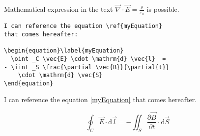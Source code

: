 \begin{Results}
Mathematical expression in the text
${\vec  {\nabla }}\cdot {\vec  {E}}={\frac  {\rho }{\varepsilon _{0}}}$
is possible.
\end{Results}

\begin{LaTeXsource}[Displayed]
\begin{verbatim}
I can reference the equation \ref{myEquation}
that comes hereafter:

\begin{equation}\label{myEquation}
  \oint _C \vec{E} \cdot \mathrm{d} \vec{l}  =
- \iint _S \frac{\partial \vec{B}}{\partial{t}}
    \cdot \mathrm{d} \vec{S}
\end{equation}
\end{verbatim}
\end{LaTeXsource}

\begin{Results}
I can reference the equation \ref{myEquation} that comes hereafter.

\begin{equation}\label{myEquation}
\oint _C \vec{E} \cdot \mathrm{d} \vec{l}  =
- \iint _S \frac{\partial \vec{B}}{\partial{t}} \cdot \mathrm{d} \vec{S}
\end{equation}
\end{Results}
